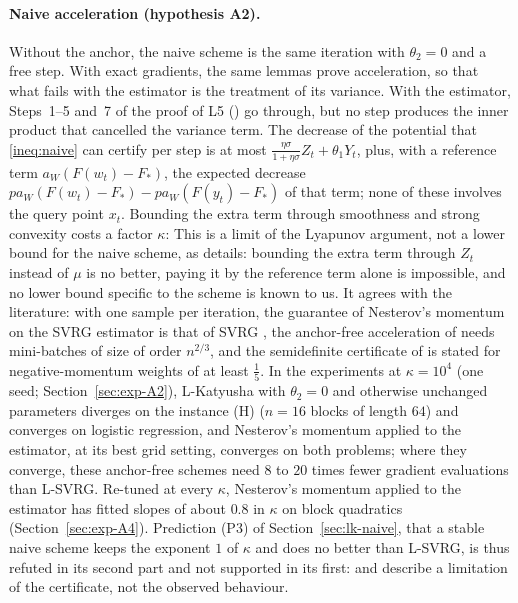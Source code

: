 \paragraph{Naive acceleration (hypothesis A2).}
Without the anchor, the naive scheme is the same iteration with $\theta_2=0$ and a free step.
With exact gradients, the same lemmas prove acceleration, so that what fails with the estimator is the treatment of
its variance.
With the estimator, Steps~1--5 and~7 of the proof of L5 () go through, but no step produces the inner
product that cancelled the variance term.
The decrease of the potential that \eqref{ineq:naive} can certify per step is at most
$\frac{\eta\sigma}{1+\eta\sigma}Z_t+\theta_1Y_t$, plus, with a reference term $a_W(F(w_t)-F_\ast)$, the expected
decrease $pa_W(F(w_t)-F_\ast)-pa_W(F(y_t)-F_\ast)$ of that term; none of these involves the query point $x_t$.
Bounding the extra term through smoothness and strong convexity costs a factor $\kappa$:
This is a limit of the Lyapunov argument, not a lower bound for the naive scheme, as 
details: bounding the extra term through $Z_t$ instead of $\mu$ is no better, paying it by the reference term alone is
impossible, and no lower bound specific to the scheme is known to us. It agrees with the literature:
with one sample per iteration, the guarantee of Nesterov's momentum on the SVRG estimator is that of SVRG
\cite{nitanda2014stochastic}, the anchor-free acceleration of \cite{driggs2022accelerating} needs mini-batches of size
of order $n^{2/3}$, and the semidefinite certificate of \cite{hu2018dissipativity} is stated for negative-momentum
weights of at least $\frac15$. In the experiments at $\kappa=10^4$ (one seed; Section~\ref{sec:exp-A2}), L-Katyusha
with $\theta_2=0$ and otherwise unchanged parameters diverges on the instance (H) ($n=16$ blocks of length $64$) and
converges on logistic regression, and Nesterov's momentum applied to the estimator, at its best grid setting, converges
on both problems; where they converge, these anchor-free schemes need $8$ to $20$ times fewer gradient evaluations
than L-SVRG. Re-tuned at every $\kappa$, Nesterov's momentum applied to the estimator has fitted slopes of about $0.8$
in $\kappa$ on block quadratics (Section~\ref{sec:exp-A4}). Prediction (P3) of Section~\ref{sec:lk-naive}, that a
stable naive scheme keeps the exponent $1$ of $\kappa$ and does no better than L-SVRG, is thus refuted in its second
part and not supported in its first:  and  describe a limitation of the
certificate, not the observed behaviour.

